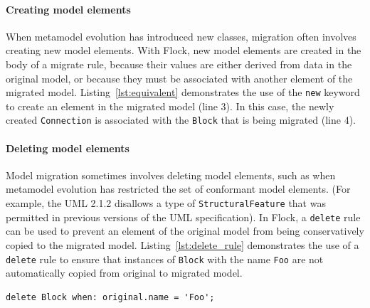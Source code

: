 \paragraph{Creating model elements} When metamodel evolution has introduced new classes, migration often involves creating new model elements. With Flock, new model elements are created in the body of a migrate rule, because their values are either derived from data in the original model, or because they must be associated with another element of the migrated model. Listing~\ref{lst:equivalent} demonstrates the use of the \texttt{new} keyword to create an element in the migrated model (line 3). In this case, the newly created \texttt{Co\-nn\-ec\-ti\-on} is associated with the \texttt{Bl\-o\-ck} that is being migrated (line 4). 

\paragraph{Deleting model elements} Model migration sometimes involves deleting model elements, such as when metamodel evolution has restricted the set of conformant model elements. (For example, the UML 2.1.2 \cite{uml212} disallows a type of \texttt{St\-ru\-ct\-ur\-alFe\-at\-u\-re} that was permitted in previous versions of the UML specification). In Flock, a \texttt{delete} rule can be used to prevent an element of the original model from being conservatively copied to the migrated model. Listing~\ref{lst:delete_rule} demonstrates the use of a \texttt{de\-le\-te} rule to ensure that instances of \texttt{Bl\-o\-ck} with the name \texttt{Foo} are not automatically copied from original to migrated model.

\begin{lstlisting}[caption=Preventing the conservative copy of original model elements, label=lst:delete_rule, language=Flock, float=tb]
delete Block when: original.name = 'Foo';
\end{lstlisting}

